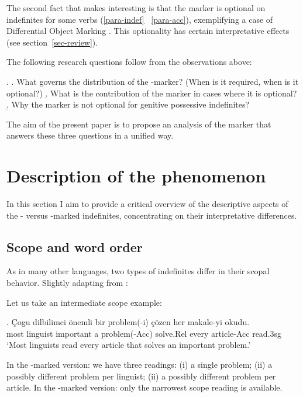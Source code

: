 \documentclass[11pt,a4paper]{article}
\begin{document}
The second fact that makes  interesting is that the marker is
optional on indefinites for some verbs (\ref{para-indef} \versus\
\ref{para-acc}), exemplifying a case of Differential Object Marking
\cttxp{aissen03}. This optionality has certain interpretative effects (see
section~\ref{sec-review}).

The following research questions follow from the observations above:

\ex.\label{res-ques}
\a.\label{res-ques-syn} What governs the distribution of the \acc-marker? (When
is it required, when is it optional?)
\b.\label{res-ques-sem} What is the contribution of the marker in cases where it is optional?
\b.\label{res-ques-genposs} Why the marker is not optional for genitive possessive indefinites?


The aim of the present paper is to propose an analysis of the marker that
answers these three questions in a unified way.

\section{Description of the phenomenon}

In this section I aim to provide a critical overview of the descriptive aspects of the \acc- versus \zero-marked indefinites, concentrating on their interpretative differences.


\subsection{Scope and word order}
\label{scscope}

As in many other languages, two types of indefinites differ in their scopal behavior. Slightly adapting from :

Let us take an intermediate scope example:

\exg. Çogu dilbilimci önemli bir problem(-i) çözen her makale-yi okudu.\\
most linguist important a problem(-Acc) solve.Rel every article-Acc read.3sg\\
`Most linguists read every article that solves an important problem.'

In the \acc-marked version: we have three readings: (i) a single problem; (ii) a possibly different problem per linguist; (ii) a possibly different problem per article. In the \zero-marked version: only the narrowest scope reading is available.
\end{document}
